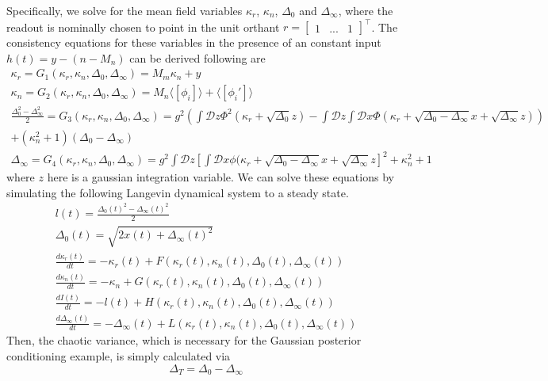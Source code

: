 \documentclass[11pt]{article}
\begin{document}
Specifically, we solve for the mean field variables $\kappa_r$, $\kappa_n$, $\Delta_0$ and $\Delta_\infty$, where the readout is nominally chosen to point in the unit orthant $r = \begin{bmatrix} 1 & ... & 1 \end{bmatrix}^\top$.  The consistency equations for these variables in the presence of an constant input $h(t) = y - (n - M_n)$ can be derived following \cite{mastrogiuseppe2018linking} are
\begin{equation}
\begin{split}
\kappa_r = G_1(\kappa_r, \kappa_n, \Delta_0, \Delta_\infty) = M_m \kappa_n + y \\
\kappa_n = G_2(\kappa_r, \kappa_n, \Delta_0, \Delta_\infty) = M_n \langle \left[ \phi_i \right] \rangle + \langle \left[ \phi_i' \right] \rangle \\
\frac{\Delta_0^2-\Delta_\infty^2}{2} = G_3(\kappa_r, \kappa_n, \Delta_0, \Delta_\infty) = g^2 \left( \int \mathcal{D}z \Phi^2(\kappa_r + \sqrt{\Delta_0}z) - \int \mathcal{D}z \int \mathcal{D}x \Phi(\kappa_r + \sqrt{\Delta_0 - \Delta_\infty}x + \sqrt{\Delta_\infty}z)  \right) \\
+ (\kappa_n^2  + 1)(\Delta_0-\Delta_\infty) \\
\Delta_\infty = G_4(\kappa_r, \kappa_n, \Delta_0, \Delta_\infty)  = g^2 \int \mathcal{D}z \left[ \int \mathcal{D}x \phi(\kappa_r + \sqrt{\Delta_0 - \Delta_\infty}x + \sqrt{\Delta_\infty}z \right]^2 + \kappa_n^2 + 1
\end{split} 
\end{equation}
where $z$ here is a gaussian integration variable. We can solve these equations by simulating the following Langevin dynamical system to a steady state.
\begin{equation}
\begin{split}
l(t) = \frac{\Delta_0(t)^2-\Delta_\infty(t)^2}{2} \\
\Delta_0(t) = \sqrt{2x(t) + \Delta_\infty(t)^2} \\
\frac{d \kappa_r(t)}{dt}  = -\kappa_r(t) + F(\kappa_r(t), \kappa_n(t), \Delta_0(t), \Delta_\infty(t)) \\
\frac{d \kappa_n(t)}{dt} = -\kappa_n + G(\kappa_r(t), \kappa_n(t), \Delta_0(t), \Delta_\infty(t)) \\
\frac{d I(t)}{dt}  = -l(t) + H(\kappa_r(t), \kappa_n(t), \Delta_0(t), \Delta_\infty(t)) \\
\frac{d \Delta_\infty(t)}{dt}  = -\Delta_\infty(t) + L(\kappa_r(t), \kappa_n(t), \Delta_0(t), \Delta_\infty(t))
\end{split}
\end{equation}
Then, the chaotic variance, which is necessary for the Gaussian posterior conditioning example, is simply calculated via
\begin{equation}
\Delta_T = \Delta_0 - \Delta_\infty
\end{equation}
\end{document}
